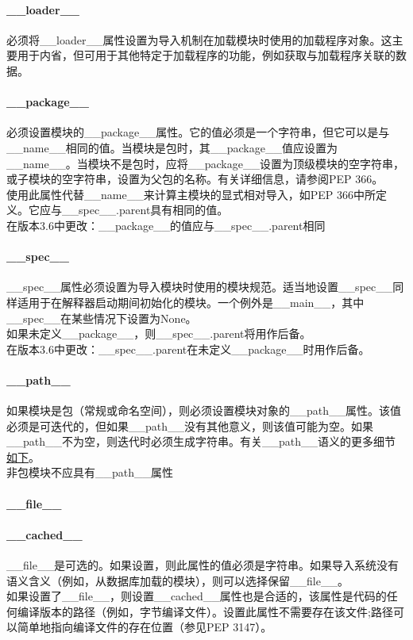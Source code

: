 \documentclass[10pt,UTF8]{ctexart}
\begin{document}
\paragraph{__loader__}必须将__loader__属性设置为导入机制在加载模块时使用的加载程序对象。这主要用于内省，但可用于其他特定于加载程序的功能，例如获取与加载程序关联的数据。
\paragraph{__package__}必须设置模块的__package__属性。它的值必须是一个字符串，但它可以是与__name__相同的值。当模块是包时，其__package__值应设置为__name__。当模块不是包时，应将__package__设置为顶级模块的空字符串，或子模块的空字符串，设置为父包的名称。有关详细信息，请参阅PEP 366。\\
\indent 使用此属性代替__name__来计算主模块的显式相对导入，如PEP 366中所定义。它应与__spec__.parent具有相同的值。\\
\indent 在版本3.6中更改：__package__的值应与__spec__.parent相同
\paragraph{__spec__}
__spec__属性必须设置为导入模块时使用的模块规范。适当地设置__spec__同样适用于在解释器启动期间初始化的模块。一个例外是__main__，其中__spec__在某些情况下设置为None。\\
\indent 如果未定义__package__，则__spec__.parent将用作后备。\\
\indent 在版本3.6中更改：__spec__.parent在未定义__package__时用作后备。
\paragraph{__path__}
如果模块是包（常规或命名空间），则必须设置模块对象的__path__属性。该值必须是可迭代的，但如果__path__没有其他意义，则该值可能为空。如果__path__不为空，则迭代时必须生成字符串。有关__path__语义的更多细节\href{https://docs.python.org/3/reference/import.html#package-path-rules}{如下}。\\
\indent 非包模块不应具有__path__属性
\paragraph{__file__}
\paragraph{__cached__}__file__是可选的。如果设置，则此属性的值必须是字符串。如果导入系统没有语义含义（例如，从数据库加载的模块），则可以选择保留__file__。\\
\indent 如果设置了__file__，则设置__cached__属性也是合适的，该属性是代码的任何编译版本的路径（例如，字节编译文件）。设置此属性不需要存在该文件;路径可以简单地指向编译文件的存在位置（参见PEP 3147）。
\end{document}

